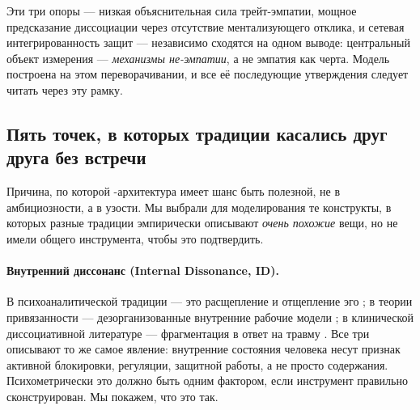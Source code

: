 Эти три опоры --- низкая объяснительная сила трейт-эмпатии, мощное предсказание диссоциации через отсутствие ментализующего отклика, и сетевая интегрированность защит --- независимо сходятся на одном выводе: центральный объект измерения --- \emph{механизмы не-эмпатии}, а не эмпатия как черта. Модель \DEIC{} построена на этом переворачивании, и все её последующие утверждения следует читать через эту рамку.

\subsection{Пять точек, в которых традиции касались друг друга без встречи}

Причина, по которой \DEIC{}-архитектура имеет шанс быть полезной, не в амбициозности, а в узости. Мы выбрали для моделирования те конструкты, в которых разные традиции эмпирически описывают \emph{очень похожие} вещи, но не имели общего инструмента, чтобы это подтвердить.

\paragraph{Внутренний диссонанс (Internal Dissonance, ID).}
В психоаналитической традиции --- это расщепление и отщепление эго \citep{ferenczi1933, klein1946}; в теории привязанности --- дезорганизованные внутренние рабочие модели \citep{main1986}; в клинической диссоциативной литературе --- фрагментация в ответ на травму \citep{putnam1997, vanderkolk2014}. Все три описывают то же самое явление: внутренние состояния человека несут признак активной блокировки, регуляции, защитной работы, а не просто содержания. Психометрически это должно быть одним фактором, если инструмент правильно сконструирован. Мы покажем, что это так.

